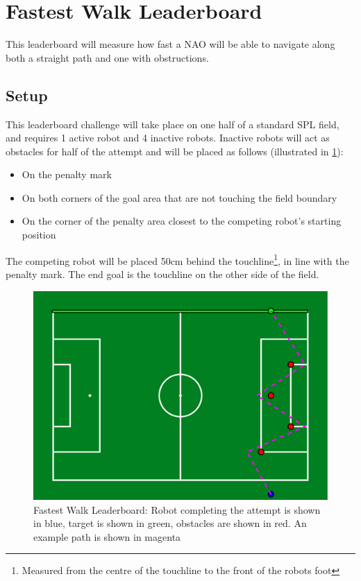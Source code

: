 
\section{Fastest Walk Leaderboard}
This leaderboard will measure how fast a NAO will be able to navigate along both a straight path and one with obstructions.

\subsection{Setup}
This leaderboard challenge will take place on one half of a standard SPL field, and requires 1 active robot and 4 inactive robots.
Inactive robots will act as obstacles for half of the attempt and will be placed as follows (illustrated in \cref{fig:walk_leaderboard}):
\begin{itemize}
    \item On the penalty mark
    \item On both corners of the goal area that are not touching the field boundary
    \item On the corner of the penalty area closest to the competing robot's starting position
\end{itemize}

The competing robot will be placed 50cm behind the touchline\footnote {Measured from the centre of the touchline to the front of the robots foot}, in line with the penalty mark.
The end goal is the touchline on the other side of the field.

\begin{figure}[t]
    \centerline{\includegraphics[width=\columnwidth]{figs/leaderboards/walk_leaderboard.pdf}}
    \caption{Fastest Walk Leaderboard: Robot completing the attempt is shown in blue, target is shown in green, obstacles are shown in red. An example path is shown in magenta}
    \label{fig:walk_leaderboard}
\end{figure}


